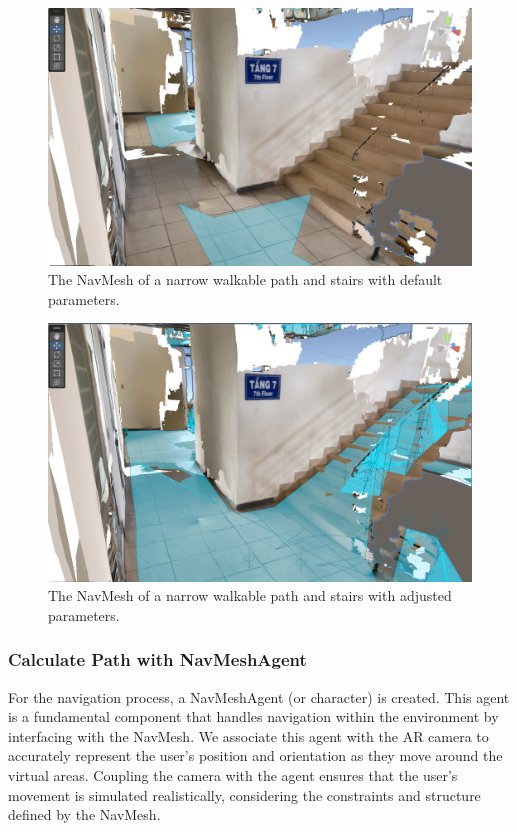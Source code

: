\begin{figure}[ht]
  \centering
  \includegraphics[scale=0.5]{content/resources/images/chap-problems-solutions/navigation-1.PNG}
  \caption{The NavMesh of a narrow walkable path and stairs with default parameters.}
  \label{fig:navigation-1}
\end{figure}

\begin{figure}[ht]
  \centering
  \includegraphics[scale=0.5]{content/resources/images/chap-problems-solutions/navigation-2.PNG}
  \caption{The NavMesh of a narrow walkable path and stairs with adjusted parameters.}
  \label{fig:navigation-2}
\end{figure}

\subsubsection{Calculate Path with NavMeshAgent}
For the navigation process, a NavMeshAgent (or character) is created. This agent is a fundamental component that handles navigation within the environment by interfacing with the NavMesh. We associate this agent with the AR camera to accurately represent the user's position and orientation as they move around the virtual areas. Coupling the camera with the agent ensures that the user's movement is simulated realistically, considering the constraints and structure defined by the NavMesh.


